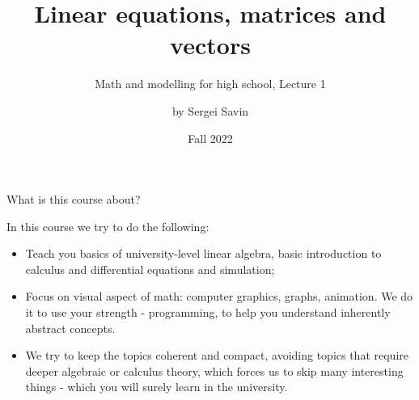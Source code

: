 \documentclass{beamer}
\title{Linear equations, matrices and vectors}
\subtitle{Math and modelling for high school, Lecture 1}
\author{by Sergei Savin}
\date{Fall 2022}
\begin{document}
\maketitle


%
%



\begin{frame}{What is this course about?}
\begin{flushleft}

In this course we try to do the following:

\begin{itemize}
	\item Teach you basics of university-level linear algebra, basic introduction to calculus and differential equations and simulation;
	\item Focus on visual aspect of math: computer graphics, graphs, animation. We do it to use your strength - programming, to help you understand inherently abstract concepts. 
	\item We try to keep the topics coherent and compact, avoiding topics that require deeper algebraic or calculus theory, which forces us to skip many interesting things - which you will surely learn in the university.
\end{itemize}

\end{flushleft}
\end{frame}
\end{document}
